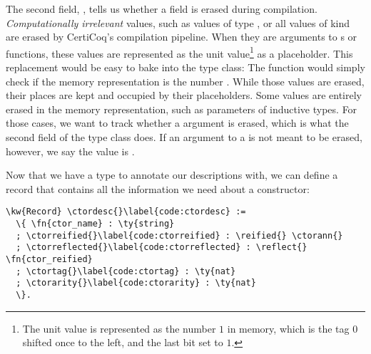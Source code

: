 The second field, \iserased{}, tells us whether a \constructor{} field is erased during compilation. \emph{Computationally irrelevant} values, such as values of type , or all values of kind  are erased by CertiCoq's compilation pipeline. When they are arguments to \constructor{}s or functions, these values are represented as the unit value\footnote{The unit value is represented as the number $1$ in memory, which is the tag $0$ shifted once to the left, and the last bit set to $1$.} as a placeholder. This replacement would be easy to bake into the \InGraph{} type class: The \graphpredicate{} function would simply check if the memory representation is the number . While those values are erased, their places are kept and occupied by their placeholders. Some values are entirely erased in the memory representation, such as \gls{parameter}s of \gls{inductive type}s. For those cases, we want to track whether a \constructor{} argument is erased, which is what the second field of the \ctorann{} type class does. If an argument to a \constructor{} is not meant to be erased, however, we say the value is .

Now that we have a \ctorann{} type to annotate our \reified{} descriptions with, we can define a record that contains all the information we need about a constructor:

\newcommand{\ctordesc}{\hyperref[code:ctordesc]{\ty{ctor\_\linebreak[0]desc}}}
\newcommand{\Desc}{\hyperref[code:Desc]{\ty{Desc}}}
\newcommand{\desc}{\hyperref[code:desc]{\fn{desc}}}
\newcommand{\ctorreified}{\hyperref[code:ctorreified]{\fn{ctor\_\linebreak[0]reified}}}
\newcommand{\ctorreflected}{\hyperref[code:ctorreflected]{\fn{ctor\_\linebreak[0]reflected}}}
\newcommand{\ctortag}{\hyperref[code:ctortag]{\fn{ctor\_\linebreak[0]tag}}}
\newcommand{\ctorarity}{\hyperref[code:ctorarity]{\fn{ctor\_\linebreak[0]arity}}}
\begin{Verbatim}
\kw{Record} \ctordesc{}\label{code:ctordesc} :=
  \{ \fn{ctor_name} : \ty{string}
  ; \ctorreified{}\label{code:ctorreified} : \reified{} \ctorann{}
  ; \ctorreflected{}\label{code:ctorreflected} : \reflect{} \fn{ctor_reified}
  ; \ctortag{}\label{code:ctortag} : \ty{nat}
  ; \ctorarity{}\label{code:ctorarity} : \ty{nat}
  \}.
\end{Verbatim}

